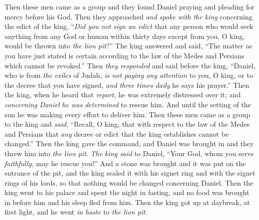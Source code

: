 \begin{biblechapter}
\verse Then these men came as a group and they found Daniel praying and pleading for mercy before his God.
\verse Then they approached \textit{and spoke with the king} concerning the edict of the king, “\textit{Did you not sign an edict} that any person who would seek anything from any God or human within thirty days except from you, O king, would be thrown into \textit{the lion pit}?” The king answered and said, “The matter as you have just stated is certain according to the law of the Medes and Persians which cannot be revoked.”
 Then \textit{they responded} and said before the king, “Daniel, who is from \textit{the exiles} of Judah, \textit{is not paying any attention} to you, O king, or to the decree that you have signed, \textit{and three times daily} he says his prayer.”
\verse Then the king, when he heard that \textit{report}, he was extremely distressed over it; and \textit{concerning Daniel} \textit{he was determined} to rescue him. And until the setting of the sun he was making every effort to deliver him.
\verse Then these men came as a group to the king and \textit{said}, “Recall, O king, that with respect to the law of the Medes and Persians that \textit{any} decree or edict that the king establishes cannot be changed.”
\verse Then the king gave the command, and Daniel was brought in and they threw him into \textit{the lion pit}. \textit{The king said} to Daniel, “Your God, whom you serve \textit{faithfully}, may he rescue you!”
\verse And a stone was brought and it was put on the entrance of the pit, and the king sealed it with his signet ring and with the signet rings of his lords, so that nothing would be changed concerning Daniel.
\verse Then the king went to his palace and spent the night in fasting, and no food was brought in before him and his sleep fled from him.
\verse Then the king got up at daybreak, at first light, and he went \textit{in haste} to \textit{the lion pit}.

\end{biblechapter}
